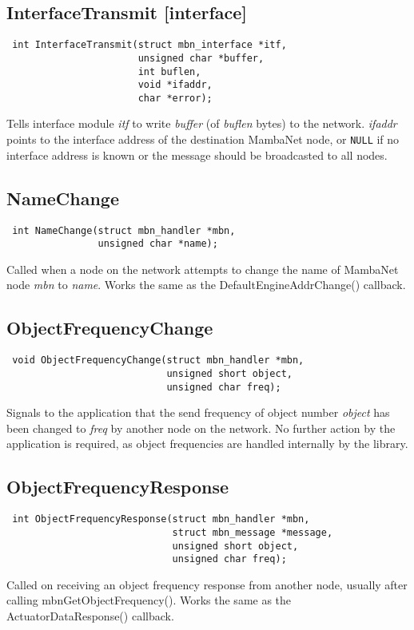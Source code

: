 \documentclass[a4paper]{report}
\begin{document}
\subsection{InterfaceTransmit \footnotesize{[interface]}}
\begin{verbatim}
 int InterfaceTransmit(struct mbn_interface *itf,
                       unsigned char *buffer,
                       int buflen,
                       void *ifaddr,
                       char *error);
\end{verbatim}
Tells interface module \textit{itf} to write \textit{buffer} (of \textit{buflen} bytes) to the network. \textit{ifaddr} points to the interface address of the destination MambaNet node, or \verb|NULL| if no interface address is known or the message should be broadcasted to all nodes.


\subsection{NameChange}
\begin{verbatim}
 int NameChange(struct mbn_handler *mbn,
                unsigned char *name);
\end{verbatim}
Called when a node on the network attempts to change the name of MambaNet node \textit{mbn} to \textit{name}. Works the same as the DefaultEngineAddrChange() callback.


\subsection{ObjectFrequencyChange}
\begin{verbatim}
 void ObjectFrequencyChange(struct mbn_handler *mbn,
                            unsigned short object,
                            unsigned char freq);
\end{verbatim}
Signals to the application that the send frequency of object number \textit{object} has been changed to \textit{freq} by another node on the network. No further action by the application is required, as object frequencies are handled internally by the library.


\subsection{ObjectFrequencyResponse}
\begin{verbatim}
 int ObjectFrequencyResponse(struct mbn_handler *mbn,
                             struct mbn_message *message,
                             unsigned short object,
                             unsigned char freq);
\end{verbatim}
Called on receiving an object frequency response from another node, usually after calling mbnGetObjectFrequency(). Works the same as the ActuatorDataResponse() callback.
\end{document}
